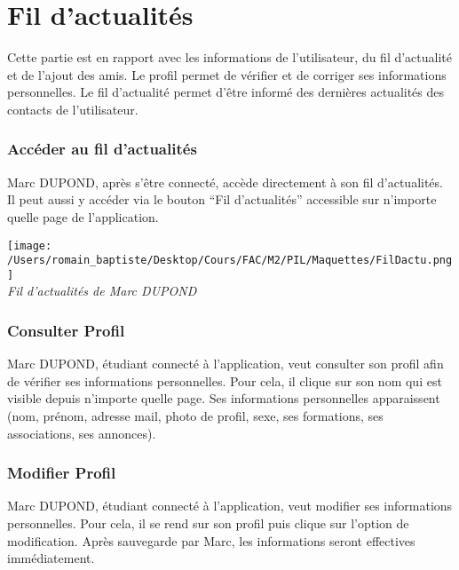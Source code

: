 \section*{Fil d'actualités}
Cette partie est en rapport avec les informations de l’utilisateur, du fil d’actualité et de l’ajout des amis. Le profil permet de vérifier et de corriger ses informations personnelles. Le fil d’actualité permet d’être informé des dernières actualités des contacts de l’utilisateur.

\subsubsection*{Accéder au fil d’actualités}
Marc DUPOND, après s’être connecté, accède directement à son fil d’actualités. Il peut aussi y accéder via le bouton “Fil d’actualités” accessible sur n’importe quelle page de l’application.
\\ 
\begin{center}
\texttt{[image: /Users/romain\_baptiste/Desktop/Cours/FAC/M2/PIL/Maquettes/FilDactu.png]}
\\
\emph{Fil d'actualités de Marc DUPOND}
\end{center}
\subsubsection*{Consulter Profil}
Marc DUPOND, étudiant connecté à l'application, veut consulter son profil afin de vérifier ses informations personnelles. Pour cela, il clique sur son nom qui est visible depuis n’importe quelle page. Ses informations personnelles apparaissent (nom, prénom, adresse mail, photo de profil, sexe, ses formations, ses associations, ses annonces).
\subsubsection*{Modifier Profil}
Marc DUPOND, étudiant connecté à l'application, veut modifier ses informations personnelles. Pour cela, il se rend sur son profil puis clique sur l’option de modification. Après sauvegarde par Marc, les informations seront effectives immédiatement.
